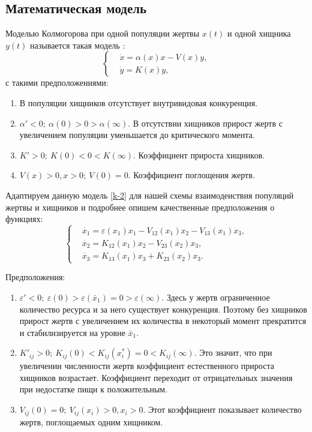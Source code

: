 \subsection{Математическая модель}
    Моделью Колмогорова при одной популяции жертвы \(x (t)\) и одной хищника \(y (t)\) называется такая модель \cite{svilog}:
    \begin{equation}
        \left\{\begin{split}
            & \dot{x} = \alpha(x)x - V(x) y, \\
            & \dot{y} = K(x) y,
        \end{split}\right. \label{k-2}
    \end{equation}
    с такими предположениями:
    
    \begin{enumerate}
        \item В популяции хищников отсутствует внутривидовая конкуренция.
        \item \( \alpha' < 0; ~ \alpha(0) > 0 > \alpha(\infty) \). В отсутствии хищников прирост жертв с увеличением популяции уменьшается до критического момента.
        \item \( K' > 0; ~ K(0) < 0 < K(\infty) \). Коэффициент прироста хищников.
        \item \( V(x) > 0, x > 0; ~ V(0) = 0 \). Коэффициент поглощения жертв.
    \end{enumerate}

    Адаптируем данную модель \eqref{k-2} для нашей схемы взаимодеиствия популяций жертвы и хищников и подробнее опишем качественные предположения о функциях:
    \begin{equation}
        \left\{\begin{split}
            & \dot{x_1} = \varepsilon(x_1)x_1 - V_{12}(x_1)x_2 - V_{13}(x_1)x_3, \\
            & \dot{x_2} = K_{12}(x_1)x_2 - V_{23}(x_2)x_3, \\
            & \dot{x_3} = K_{13}(x_1)x_3 + K_{23}(x_2)x_3. 
        \end{split}\right. \label{k-3g}
    \end{equation}

    Предположения:
    \begin{enumerate}
        \item \( \varepsilon' < 0; ~ \varepsilon(0) > \varepsilon(\bar{x}_1) = 0 > \varepsilon(\infty)\). Здесь у жертв ограниченное количество ресурса и за него существует конкуренция. Поэтому без хищников прирост жертв с увеличением их количества в некоторый момент прекратится и стабилизируется на уровне \( \bar{x}_1 \).
        \item \( K'_{ij} > 0; ~ K_{ij}(0) < K_{ij}(x_i^*) = 0 < K_{ij} (\infty) \). Это значит, что при увеличении численности жертв коэффициент естественного прироста хищников возрастает. Коэффициент переходит от отрицательных значения при недостатке пищи к положительным.
        \item \( V_{ij}(0) = 0; ~ V_{ij} (x_i) > 0, x_i > 0 \). Этот коэффициент показывает количество жертв, поглощаемых одним хищником.
    \end{enumerate}

